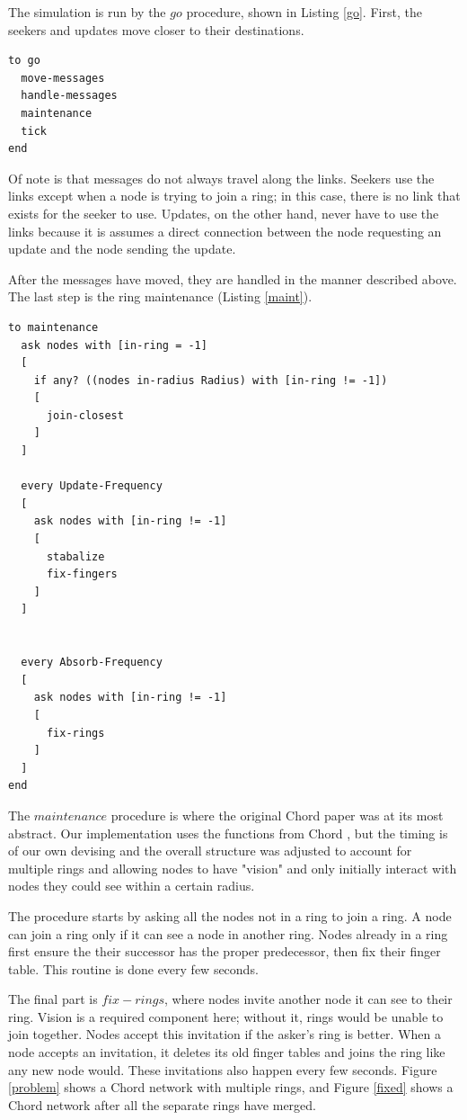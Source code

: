 \documentclass[12pt]{ieeetran} %
\begin{document}
The simulation is run by the $go$ procedure, shown in Listing \ref{go}.  First, the seekers and updates move closer to their destinations.


\begin{lstlisting}[caption={The topmost procedure of the simulation.},label=go]
to go
  move-messages
  handle-messages
  maintenance
  tick
end
\end{lstlisting}


Of note is that messages do not always travel along the links.  Seekers use the links except when a node is trying to join a ring;  in this case, there is no link that exists for the seeker to use. Updates, on the other hand, never have to use the links because it is assumes a direct connection between the node requesting an update and the node sending the update.

After the messages have moved, they are handled in the manner described above. The last step is the ring maintenance (Listing \ref{maint}).



\begin{lstlisting}[caption={Network maintenance.},label=maint]
to maintenance
  ask nodes with [in-ring = -1] 
  [
    if any? ((nodes in-radius Radius) with [in-ring != -1])
    [
      join-closest
    ]
  ] 
     
  every Update-Frequency
  [
    ask nodes with [in-ring != -1]
    [
      stabalize
      fix-fingers
    ]
  ]
  
  
  every Absorb-Frequency
  [
    ask nodes with [in-ring != -1]
    [
      fix-rings
    ]
  ]
end

\end{lstlisting}




The $maintenance$ procedure is where the original Chord paper was at its most abstract.  Our implementation uses the functions from Chord \cite{Chord}, but the timing is of our own devising and the overall structure was adjusted to account for multiple rings and allowing nodes to have "vision"  and only initially interact with nodes they could see within a certain radius.

The procedure starts by asking all the nodes not in a ring to join a ring.  A node can join a ring only if it can see a node in another ring.  Nodes already in a ring first ensure the their successor has the proper predecessor, then fix their finger table.  This routine is done every few seconds.

The final part is $fix-rings$, where nodes invite another node it can see to their ring. Vision is a required component here;  without it, rings would be unable to join together. Nodes accept this invitation if the asker's ring is better.  When a node accepts an invitation, it deletes its old finger tables and joins the ring like any new node would.  These invitations also happen every few seconds.  Figure \ref{problem} shows a Chord network with multiple rings, and Figure \ref{fixed} shows a Chord network after all the separate rings have merged.
\end{document}
